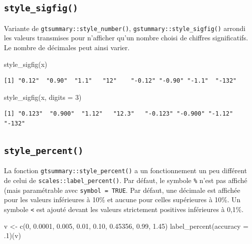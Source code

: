 \documentclass[
  letterpaper,
  DIV=11,
  numbers=noendperiod,
  oneside]{scrreprt}
\newenvironment{Shaded}{\begin{snugshade}}{\end{snugshade}}
\newcommand{\AttributeTok}[1]{\textcolor[rgb]{0.40,0.45,0.13}{#1}}
\newcommand{\DecValTok}[1]{\textcolor[rgb]{0.68,0.00,0.00}{#1}}
\newcommand{\FloatTok}[1]{\textcolor[rgb]{0.68,0.00,0.00}{#1}}
\newcommand{\FunctionTok}[1]{\textcolor[rgb]{0.28,0.35,0.67}{#1}}
\newcommand{\NormalTok}[1]{\textcolor[rgb]{0.00,0.23,0.31}{#1}}
\newcommand{\OtherTok}[1]{\textcolor[rgb]{0.00,0.23,0.31}{#1}}
\begin{document}
\hypertarget{style_sigfig}{%
\subsection{\texorpdfstring{\texttt{style\_sigfig()}}{style\_sigfig()}}\label{style_sigfig}}

Variante de \texttt{gtsummary::style\_number()},
\texttt{gstummary::style\_sigfig()} arrondi les valeurs transmises pour
n'afficher qu'un nombre choisi de chiffres significatifs. Le nombre de
décimales peut ainsi varier.

\begin{Shaded}
\begin{Highlighting}[]
\FunctionTok{style\_sigfig}\NormalTok{(x)}
\end{Highlighting}
\end{Shaded}

\begin{verbatim}
[1] "0.12"  "0.90"  "1.1"   "12"    "-0.12" "-0.90" "-1.1"  "-132" 
\end{verbatim}

\begin{Shaded}
\begin{Highlighting}[]
\FunctionTok{style\_sigfig}\NormalTok{(x, }\AttributeTok{digits =} \DecValTok{3}\NormalTok{)}
\end{Highlighting}
\end{Shaded}

\begin{verbatim}
[1] "0.123"  "0.900"  "1.12"   "12.3"   "-0.123" "-0.900" "-1.12"  "-132"  
\end{verbatim}

\hypertarget{style_percent}{%
\subsection{\texorpdfstring{\texttt{style\_percent()}}{style\_percent()}}\label{style_percent}}

La fonction \texttt{gtsummary::style\_percent()} a un fonctionnement un
peu différent de celui de \texttt{scales::label\_percent()}. Par défaut,
le symbole \texttt{\%} n'est pas affiché (mais paramétrable avec
\texttt{symbol\ =\ TRUE}. Par défaut, une décimale est affichée pour les
valeurs inférieures à 10\% et aucune pour celles supérieures à 10\%. Un
symbole \texttt{\textless{}} est ajouté devant les valeurs strictement
positives inférieures à 0,1\%.

\begin{Shaded}
\begin{Highlighting}[]
\NormalTok{v }\OtherTok{\textless{}{-}} \FunctionTok{c}\NormalTok{(}\DecValTok{0}\NormalTok{, }\FloatTok{0.0001}\NormalTok{, }\FloatTok{0.005}\NormalTok{, }\FloatTok{0.01}\NormalTok{, }\FloatTok{0.10}\NormalTok{, }\FloatTok{0.45356}\NormalTok{, }\FloatTok{0.99}\NormalTok{, }\FloatTok{1.45}\NormalTok{)}
\FunctionTok{label\_percent}\NormalTok{(}\AttributeTok{accuracy =}\NormalTok{ .}\DecValTok{1}\NormalTok{)(v)}
\end{Highlighting}
\end{Shaded}
\end{document}
